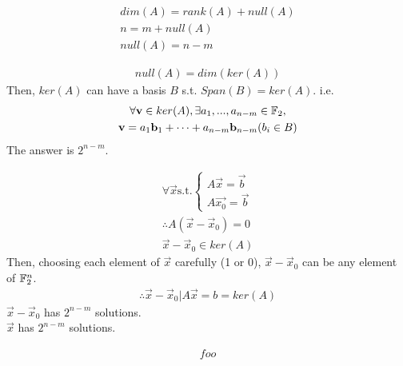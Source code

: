 \documentclass[1]{mathtoolkit}
\begin{document}
\begin{p}
  \item
    \begin{subp}
      \item
        \begin{gather}
          dim(A) = rank(A) + null(A) \\
          n = m + null(A) \\
          null(A) = n - m
        \end{gather}
      \item
        \begin{gather}
          null(A) = dim(ker(A))
        \end{gather}
        Then, $ker(A)$ can have a basis $B$ s.t. $Span(B) = ker(A)$.
        i.e.
        \begin{gather}
          \forall \mathbf{v} \in ker(A),
          \exists a_1, ..., a_{n-m} \in \mathbb{F}_2, \\
          \mathbf{v} = a_1 \mathbf{b}_1 + \dots + a_{n-m} \mathbf{b}_{n-m} (b_i \in B)
        \end{gather}
        \therefore The answer is $2^{n-m}$.
      \item
        \begin{gather}
          \forall \vec{x}
          \text{s.t.}
          \begin{cases}
            A \vec{x} = \vec{b} \\
            A \vec{x_0} = \vec{b}
          \end{cases} \\
          \therefore A (\vec{x} - \vec{x}_0) = 0 \\
          \vec{x} - \vec{x}_0 \in ker(A)
        \end{gather}
        Then, choosing each element of $\vec{x}$ carefully (1 or 0),
        $\vec{x} - \vec{x}_0$ can be any element of $\mathbb{F}^n_2$.
        \begin{gather}
          \therefore {\vec{x} - \vec{x}_0 | A \vec{x} = b } = ker(A)
        \end{gather}
        \therefore $\vec{x} - \vec{x}_0$ has $2^{n-m}$ solutions. \\
        \therefore $\vec{x}$ has $2^{n-m}$ solutions. \\
    \end{subp}

  \item
    \begin{subp}
      \begin{gather}
        foo
      \end{gather}
    \end{subp}
\end{p}
\end{document}
